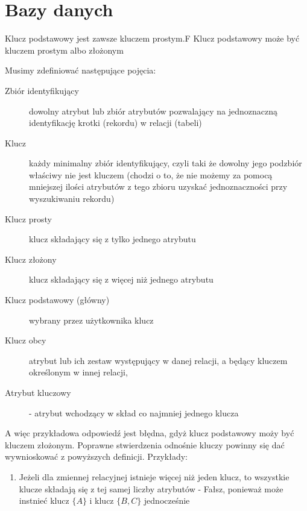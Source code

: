\chapter{Bazy danych}
\PartialToc %
\startcontents[chapters]



{Klucz podstawowy jest zawsze kluczem prostym.}{F}
{Klucz podstawowy może być kluczem prostym albo złożonym}
{\\}

\noindent
Musimy zdefiniować następujące pojęcia:
\begin{description}
   \item[Zbiór identyfikujący] dowolny atrybut lub zbiór atrybutów pozwalający na jednoznaczną identyfikację krotki (rekordu) w relacji (tabeli)
   \item[Klucz] każdy minimalny zbiór identyfikujący, czyli taki że dowolny jego podzbiór właściwy nie jest kluczem (chodzi o to, że nie możemy za pomocą mniejszej ilości atrybutów z tego zbioru uzyskać jednoznaczności przy wyszukiwaniu rekordu)
   \item[Klucz prosty] klucz składający się z tylko jednego atrybutu
   \item[Klucz złożony] klucz składający się z więcej niż jednego atrybutu
   \item[Klucz podstawowy (główny)] wybrany przez użytkownika klucz
   \item[Klucz obcy] atrybut lub ich zestaw występujący w danej relacji, a będący kluczem określonym w innej relacji,
   \item[Atrybut kluczowy] - atrybut wchodzący w skład co najmniej jednego klucza
\end{description}
A więc przykładowa odpowiedź jest błędna, gdyż klucz podstawowy moży być kluczem złożonym. Poprawne stwierdzenia odnośnie kluczy powinny się dać wywnioskować z powyższych definicji. Przykłady:
\begin{enumerate}
\item Jeżeli dla zmiennej relacyjnej istnieje więcej niż jeden klucz, to wszystkie klucze składają się z tej samej liczby atrybutów - Fałsz, ponieważ może instnieć klucz $\{A\}$ i klucz $\{B, C\}$ jednocześnie
\end{enumerate}

